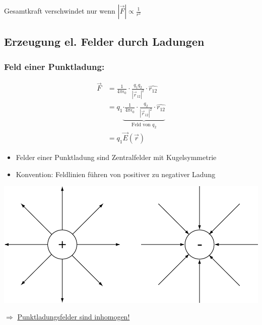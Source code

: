 \documentclass[11pt]{article}
\begin{document}
Gesamtkraft verschwindet nur wenn $|\vec{F}| \propto \frac{1}{r^2}$

\subsection{Erzeugung el. Felder durch Ladungen}

	\subsubsection{Feld einer Punktladung:}
	
	\begin{align*}
		\vec{F} &= \frac{1}{4\pi\epsilon_0} \cdot \frac{q_1 q_2}{ |\vec{r}_{12}|^2 } \cdot \hat{r_{12}} \\
					&=q_1 \underbrace{ \cdot \frac{1}{4\pi\epsilon_0} \cdot \frac{q_2}{ |\vec{r}_{12}|^2 } \cdot \hat{r_{12}}  }_{\text{Feld von }q_2} \\
					&=q_1 \vec{E}(\vec{r})
	\end{align*}
	\begin{itemize}
		\item Felder einer Punktladung sind Zentralfelder mit Kugelsymmetrie
		\item Konvention: Feldlinien führen von positiver zu negativer Ladung
	\end{itemize}
	\begin{center}
		\includegraphics[width=0.7\linewidth]{skizzen/14/14_4B0}
	\end{center}

	$ \Rightarrow $ \underline{Punktladungsfelder sind inhomogen!}
	
\end{document}
